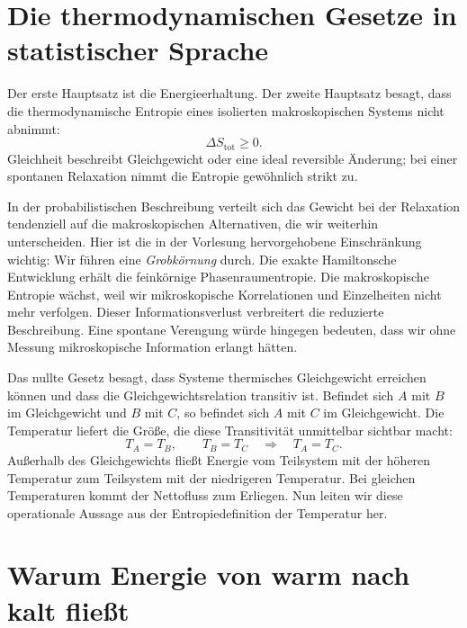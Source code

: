 \section{Die thermodynamischen Gesetze in statistischer Sprache}

Der erste Hauptsatz ist die Energieerhaltung. Der zweite Hauptsatz besagt, dass die thermodynamische Entropie eines isolierten makroskopischen Systems nicht abnimmt:
\begin{equation}
 \Delta S_{\mathrm{tot}}\geq0.
 \label{eq:sm3-second-law}
\end{equation}
Gleichheit beschreibt Gleichgewicht oder eine ideal reversible Änderung; bei einer spontanen Relaxation nimmt die Entropie gewöhnlich strikt zu.

In der probabilistischen Beschreibung verteilt sich das Gewicht bei der Relaxation tendenziell auf die makroskopischen Alternativen, die wir weiterhin unterscheiden. Hier ist die in der Vorlesung hervorgehobene Einschränkung wichtig: Wir führen eine \emph{Grobkörnung} durch. Die exakte Hamiltonsche Entwicklung erhält die feinkörnige Phasenraumentropie. Die makroskopische Entropie wächst, weil wir mikroskopische Korrelationen und Einzelheiten nicht mehr verfolgen. Dieser Informationsverlust verbreitert die reduzierte Beschreibung. Eine spontane Verengung würde hingegen bedeuten, dass wir ohne Messung mikroskopische Information erlangt hätten.

Das nullte Gesetz besagt, dass Systeme thermisches Gleichgewicht erreichen können und dass die Gleichgewichtsrelation transitiv ist. Befindet sich \(A\) mit \(B\) im Gleichgewicht und \(B\) mit \(C\), so befindet sich \(A\) mit \(C\) im Gleichgewicht. Die Temperatur liefert die Größe, die diese Transitivität unmittelbar sichtbar macht:
\[
 T_A=T_B,\qquad T_B=T_C
 \quad\Longrightarrow\quad
 T_A=T_C.
\]
Außerhalb des Gleichgewichts fließt Energie vom Teilsystem mit der höheren Temperatur zum Teilsystem mit der niedrigeren Temperatur. Bei gleichen Temperaturen kommt der Nettofluss zum Erliegen. Nun leiten wir diese operationale Aussage aus der Entropiedefinition der Temperatur her.

\section{Warum Energie von warm nach kalt fließt}

